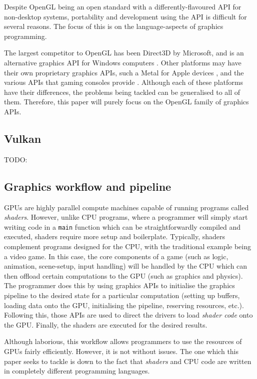 \documentclass[a4paper,12pt,twoside,openright]{report}
\begin{document}
Despite OpenGL being an open standard with a differently-flavoured API for
non-desktop systems, portability and development using the API is difficult for
several reasons. The focus of this is on the language-aspects of graphics
programming.

The largest competitor to OpenGL has been Direct3D by Microsoft, and is an
alternative graphics API for Windows computers \cite{TODO}. Other platforms may
have their own proprietary graphics APIs, such a Metal for Apple devices
\cite{TODO}, and the various APIs that gaming consoles provide \cite{TODO}.
Although each of these platforms have their differences, the problems being
tackled can be generalised to all of them. Therefore, this paper will purely
focus on the OpenGL family of graphics APIs.

\subsection{Vulkan}

TODO:

\subsection{Graphics workflow and pipeline}

GPUs are highly parallel compute machines capable of running programs called
\textit{shaders}. However, unlike CPU programs, where a programmer will simply
start writing code in a \texttt{main} function which can be straightforwardly
compiled and executed, shaders require more setup and boilerplate. Typically,
shaders complement programs designed for the CPU, with the traditional example
being a video game. In this case, the core components of a game (such as logic,
animation, scene-setup, input handling) will be handled by the CPU which can
then offload certain computations to the GPU (such as graphics and physics).
The programmer does this by using graphics APIs to initialise the graphics
pipeline to the desired state for a particular computation (setting up buffers,
loading data onto the GPU, initialising the pipeline, reserving resources,
etc.). Following this, those APIs are used to direct the drivers to load
\textit{shader code} onto the GPU. Finally, the shaders are executed for the
desired results.

Although laborious, this workflow allows programmers to use the resources of
GPUs fairly efficiently. However, it is not without issues. The one which this
paper seeks to tackle is down to the fact that \textit{shaders} and CPU code
are written in completely different programming languages.
\end{document}
